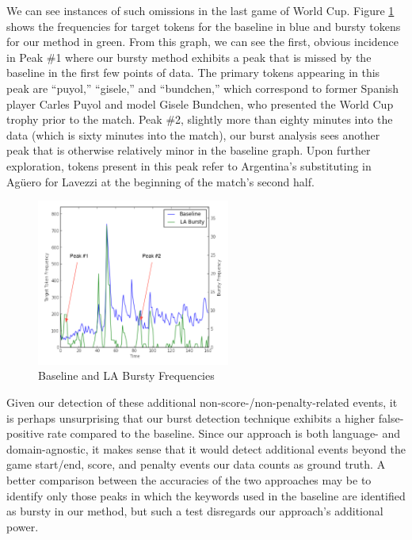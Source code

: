 \documentclass{sig-alternate}
\begin{document}
We can see instances of such omissions in the last game of World Cup.
Figure \ref{fig:worldCupFreqs} shows the frequencies for target tokens for the baseline in blue and bursty tokens for our method in green.
From this graph, we can see the first, obvious incidence in Peak \#1 where our bursty method exhibits a peak that is missed by the baseline in the first few points of data.
The primary tokens appearing in this peak are ``puyol,'' ``gisele,'' and ``bundchen,'' which correspond to former Spanish player Carles Puyol and model Gisele Bundchen, who presented the World Cup trophy prior to the match.
Peak \#2, slightly more than eighty minutes into the data (which is sixty minutes into the match), our burst analysis sees another peak that is otherwise relatively minor in the baseline graph.
Upon further exploration, tokens present in this peak refer to Argentina's substituting in Ag\"{u}ero for Lavezzi at the beginning of the match's second half.

\begin{figure}[hbtp]
\begin{center}
\includegraphics[width=2.5in]{./figures/wc0713freq-labeled.png}
\caption{Baseline and LA Bursty Frequencies}
\label{fig:worldCupFreqs}
\end{center}
\end{figure}

Given our detection of these additional non-score-/non-penalty-related events, it is perhaps unsurprising that our burst detection technique exhibits a higher false-positive rate compared to the baseline.
Since our approach is both language- and domain-agnostic, it makes sense that it would detect additional events beyond the game start/end, score, and penalty events our data counts as ground truth.
A better comparison between the accuracies of the two approaches may be to identify only those peaks in which the keywords used in the baseline are identified as bursty in our method, but such a test disregards our approach's additional power.
\end{document}
